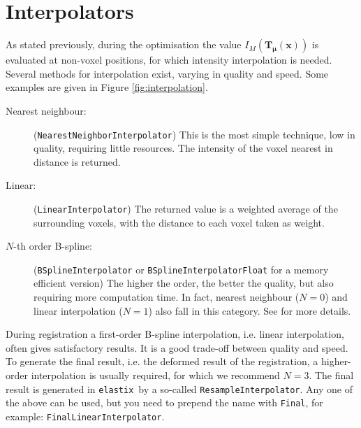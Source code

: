 \documentclass[]{report}
\newcommand{\elastix}{\texttt{elastix}}
\newcommand{\vmu}{\bm{\mu}}
\newcommand{\vTmx}{\bm{T}_{\vmu}(\bm{x})}
\begin{document}
\section{Interpolators}\label{sec:comp:interpolator}

As stated previously, during the optimisation the value $I_M(\vTmx)$
is evaluated at non-voxel positions, for which intensity
interpolation is needed. Several methods for interpolation exist,
varying in quality and speed. Some examples are given in Figure
\ref{fig:interpolation}.

\begin{description}
\item[Nearest neighbour:] (\texttt{NearestNeighborInterpolator}) This is the most simple technique, low in
quality, requiring little resources. The intensity of the voxel
nearest in distance is returned.

\item[Linear:] (\texttt{LinearInterpolator}) The returned value is a weighted
average of the surrounding voxels, with the distance to each voxel
taken as weight.

\item[$N$-th order B-spline:] (\texttt{BSplineInterpolator} or
\texttt{BSplineInterpolatorFloat} for a memory efficient version)
The higher the order, the better the quality, but also requiring
more computation time. In fact, nearest neighbour ($N=0$) and
linear interpolation ($N=1$) also fall in this category. See
\citet{Unser99} for more details.
\end{description}

During registration a first-order B-spline interpolation, i.e. linear
interpolation, often gives satisfactory results. It is a good
trade-off between quality and speed. To generate the final result,
i.e. the deformed result of the registration, a higher-order
interpolation is usually required, for which we recommend $N=3$. The
final result is generated in \elastix\ by a so-called
\texttt{ResampleInterpolator}. Any one of the above can be used, but
you need to prepend the name with \texttt{Final}, for example:
\texttt{FinalLinearInterpolator}.
\end{document}
